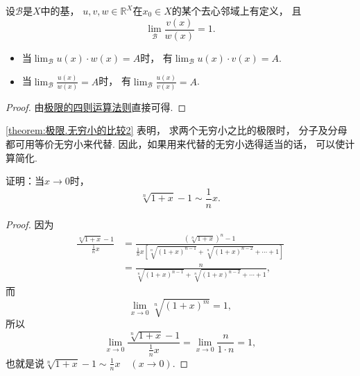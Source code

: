 \begin{theorem}\label{theorem:极限.无穷小的比较2}
设\(\mathcal{B}\)是\(X\)中的基，
\(u,v,w\in\mathbb{R}^X\)在\(x_0 \in X\)的某个去心邻域上有定义，
且\begin{equation*}
	\lim_\mathcal{B} \frac{v(x)}{w(x)} = 1.
\end{equation*}
\begin{itemize}
	\item 当\(\lim_\mathcal{B} u(x) \cdot w(x) = A\)时，
	有\(\lim_\mathcal{B} u(x) \cdot v(x) = A\).

	\item 当\(\lim_\mathcal{B} \frac{u(x)}{w(x)} = A\)时，
	有\(\lim_\mathcal{B} \frac{u(x)}{v(x)} = A\).
\end{itemize}
\begin{proof}
由\hyperref[theorem:极限.极限的四则运算法则]{极限的四则运算法则}直接可得.
\end{proof}
\end{theorem}

\cref{theorem:极限.无穷小的比较2} 表明，
求两个无穷小之比的极限时，
分子及分母都可用等价无穷小来代替.
因此，如果用来代替的无穷小选得适当的话，
可以使计算简化.

\begin{example}
证明：当\(x\to0\)时，\begin{equation}
	\sqrt[n]{1+x} - 1 \sim \frac1n x.
\end{equation}
\begin{proof}
因为\begin{align*}
	\frac{\sqrt[n]{1+x} - 1}{\frac1n x}
	&= \frac{(\sqrt[n]{1+x})^n - 1}{\frac1n x \left[ \sqrt[n]{(1+x)^{n-1}} + \sqrt[n]{(1+x)^{n-2}} + \dotsb + 1 \right]} \\
	&= \frac{n}{\sqrt[n]{(1+x)^{n-1}} + \sqrt[n]{(1+x)^{n-2}} + \dotsb + 1},
\end{align*}
而\begin{equation*}
	\lim_{x\to0} \sqrt[n]{(1+x)^m} = 1,
\end{equation*}
所以\begin{equation*}
	\lim_{x\to0} \frac{\sqrt[n]{1+x} - 1}{\frac1n x} = \lim_{x\to0} \frac{n}{1 \cdot n} = 1,
\end{equation*}
也就是说\(\sqrt[n]{1+x} - 1 \sim \frac1n x \quad(x\to0)\).
\end{proof}
\end{example}

